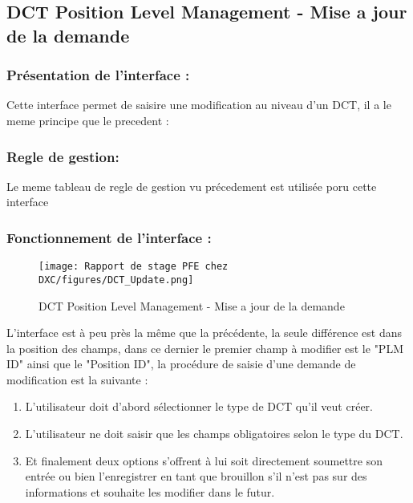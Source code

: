 
\subsection{DCT Position Level Management - Mise a jour de la demande}

\subsubsection{Présentation de l'interface :}

Cette interface permet de saisire une modification au niveau d'un DCT, il a le meme principe que le precedent : 

\subsubsection{Regle de gestion:}

Le meme tableau de regle de gestion vu précedement est utilisée poru cette interface

\subsubsection{Fonctionnement de l'interface :}

\begin{figure}[H]
    \centering
    \texttt{[image: Rapport de stage PFE chez DXC/figures/DCT\_Update.png]}
    \caption{DCT Position Level Management - Mise a jour de la demande}
\end{figure}

L'interface est à peu près la même que la précédente, la seule différence est dans la position des champs, dans ce dernier le premier champ à modifier est le "PLM ID" ainsi que le "Position ID", la procédure de saisie d'une demande de modification est la suivante :

\begin{enumerate}
    
    \item L'utilisateur doit d'abord sélectionner le type de DCT qu'il veut créer.
    \vspace{0.1cm}
    \item L'utilisateur ne doit saisir que les champs obligatoires selon le type du DCT.
    \vspace{0.1cm}
    \item Et finalement deux options s’offrent à lui soit directement soumettre son entrée ou bien l'enregistrer en tant que brouillon s'il n'est pas sur des informations et souhaite les modifier dans le futur.

\end{enumerate}

